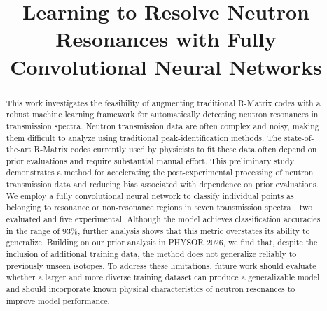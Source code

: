 \documentclass{style/nseJournal}
\begin{document}
\title{Learning to Resolve Neutron Resonances with Fully Convolutional Neural Networks}

{}
{}

{}


\titlePage

\begin{abstract}
This work investigates the feasibility of augmenting traditional R-Matrix codes with a robust machine learning framework for automatically detecting neutron resonances in transmission spectra. Neutron transmission data are often complex and noisy, making them difficult to analyze using traditional peak-identification methods. The state-of-the-art R-Matrix codes currently used by physicists to fit these data often depend on prior evaluations and require substantial manual effort. This preliminary study demonstrates a method for accelerating the post-experimental processing of neutron transmission data and reducing bias associated with dependence on prior evaluations. We employ a fully convolutional neural network to classify individual points as belonging to resonance or non-resonance regions in seven transmission spectra---two evaluated and five experimental. Although the model achieves classification accuracies in the range of 93\%, further analysis shows that this metric overstates its ability to generalize. Building on our prior analysis in PHYSOR 2026, we find that, despite the inclusion of additional training data, the method does not generalize reliably to previously unseen isotopes. To address these limitations, future work should evaluate whether a larger and more diverse training dataset can produce a generalizable model and should incorporate known physical characteristics of neutron resonances to improve model performance.

\end{abstract}
\end{document}
